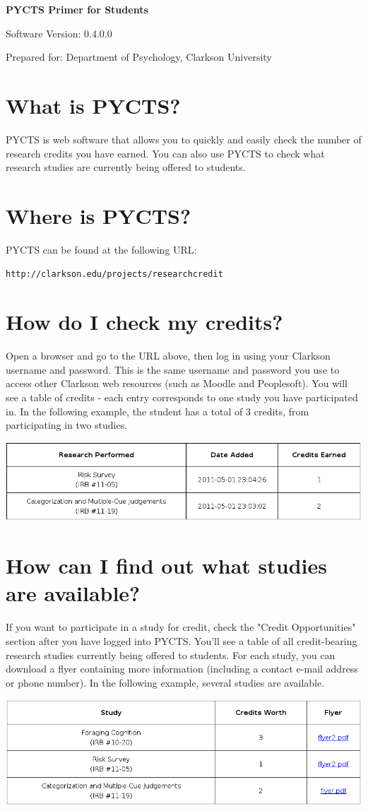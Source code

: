 \documentclass[letterpaper]{article}
\newcommand{\softwareversion}{0.4.0.0}
\begin{document}
\begin{center}
{\bf {\huge PYCTS Primer for Students } }

Software Version: \softwareversion

Prepared for: Department of Psychology, Clarkson University
\end{center}

\section{What is PYCTS?}
PYCTS is web software that allows you to quickly and easily check the number of research credits you have earned. You can also use PYCTS to check what research studies are currently being offered to students.

\section{Where is PYCTS?}
PYCTS can be found at the following URL:

{\tt http://clarkson.edu/projects/researchcredit}

\section{How do I check my credits?}
Open a browser and go to the URL above, then log in using your Clarkson username and password. This is the same username and password you use to access other Clarkson web resources (such as Moodle and Peoplesoft). You will see a table of credits - each entry corresponds to one study you have participated in. In the following example, the student has a total of 3 credits, from participating in two studies.

\includegraphics[width=\textwidth]{../images/student_main-screen.png}

\section{How can I find out what studies are available?}
If you want to participate in a study for credit, check the "Credit Opportunities" section after you have logged into PYCTS. You'll see a table of all credit-bearing research studies currently being offered to students. For each study, you can download a flyer containing more information (including a contact e-mail address or phone number). In the following example, several studies are available.

\includegraphics[width=\textwidth]{../images/student_studies.png}
\end{document}
